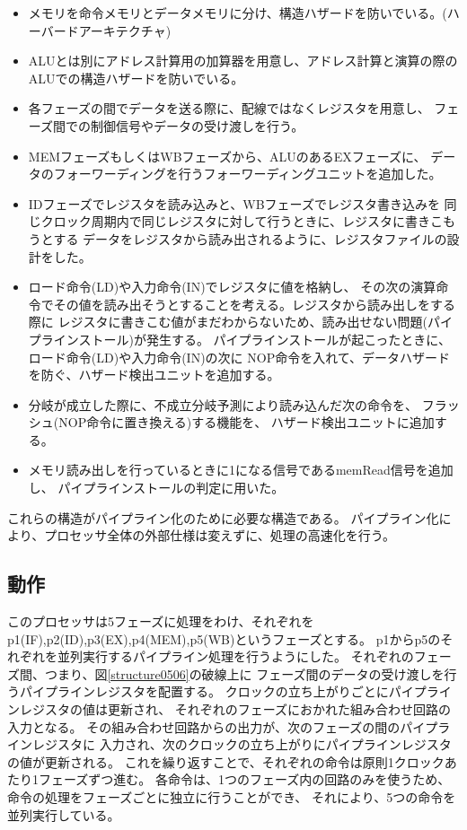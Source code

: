 \documentclass[a4j,titlepage]{jarticle}
\begin{document}
\begin{itemize}
\item メモリを命令メモリとデータメモリに分け、構造ハザードを防いでいる。(ハーバードアーキテクチャ)
\item ALUとは別にアドレス計算用の加算器を用意し、アドレス計算と演算の際のALUでの構造ハザードを防いでいる。
\item 各フェーズの間でデータを送る際に、配線ではなくレジスタを用意し、
フェーズ間での制御信号やデータの受け渡しを行う。
\item MEMフェーズもしくはWBフェーズから、ALUのあるEXフェーズに、
データのフォーワーディングを行うフォーワーディングユニットを追加した。
\item IDフェーズでレジスタを読み込みと、WBフェーズでレジスタ書き込みを
同じクロック周期内で同じレジスタに対して行うときに、レジスタに書きこもうとする
データをレジスタから読み出されるように、レジスタファイルの設計をした。
\item ロード命令(LD)や入力命令(IN)でレジスタに値を格納し、
その次の演算命令でその値を読み出そうとすることを考える。レジスタから読み出しをする際に
レジスタに書きこむ値がまだわからないため、読み出せない問題(パイプラインストール)が発生する。
パイプラインストールが起こったときに、ロード命令(LD)や入力命令(IN)の次に
NOP命令を入れて、データハザードを防ぐ、ハザード検出ユニットを追加する。
\item 分岐が成立した際に、不成立分岐予測により読み込んだ次の命令を、
フラッシュ(NOP命令に置き換える)する機能を、
ハザード検出ユニットに追加する。
\item メモリ読み出しを行っているときに1になる信号であるmemRead信号を追加し、
パイプラインストールの判定に用いた。
\end{itemize}

これらの構造がパイプライン化のために必要な構造である。
パイプライン化により、プロセッサ全体の外部仕様は変えずに、処理の高速化を行う。

\subsection{動作}

このプロセッサは5フェーズに処理をわけ、それぞれを
p1(IF),p2(ID),p3(EX),p4(MEM),p5(WB)というフェーズとする。
p1からp5のそれぞれを並列実行するパイプライン処理を行うようにした。
それぞれのフェーズ間、つまり、図\ref{structure0506}の破線上に
フェーズ間のデータの受け渡しを行うパイプラインレジスタを配置する。
クロックの立ち上がりごとにパイプラインレジスタの値は更新され、
それぞれのフェーズにおかれた組み合わせ回路の入力となる。
その組み合わせ回路からの出力が、次のフェーズの間のパイプラインレジスタに
入力され、次のクロックの立ち上がりにパイプラインレジスタの値が更新される。
これを繰り返すことで、それぞれの命令は原則1クロックあたり1フェーズずつ進む。
各命令は、1つのフェーズ内の回路のみを使うため、
命令の処理をフェーズごとに独立に行うことができ、
それにより、5つの命令を並列実行している。
\end{document}
